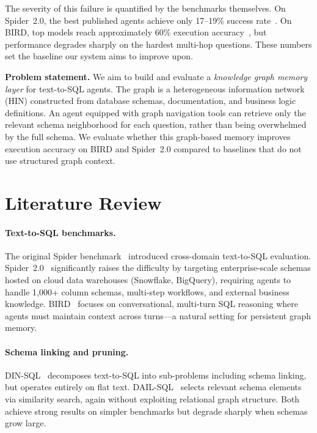 \documentclass[11pt]{article}
\begin{document}
The severity of this failure is quantified by the benchmarks themselves.
On Spider~2.0, the best published agents achieve only 17--19\% success rate~\cite{yu2024spider2}.
On BIRD, top models reach approximately 60\% execution accuracy~\cite{li2024bird}, but performance degrades sharply on the hardest multi-hop questions.
These numbers set the baseline our system aims to improve upon.

\textbf{Problem statement.}
We aim to build and evaluate a \emph{knowledge graph memory layer} for text-to-SQL agents.
The graph is a heterogeneous information network (HIN) constructed from database schemas, documentation, and business logic definitions.
An agent equipped with graph navigation tools can retrieve only the relevant schema neighborhood for each question, rather than being overwhelmed by the full schema.
We evaluate whether this graph-based memory improves execution accuracy on BIRD and Spider~2.0 compared to baselines that do not use structured graph context.

\section{Literature Review}

\paragraph{Text-to-SQL benchmarks.}
The original Spider benchmark~\cite{yu2018spider} introduced cross-domain text-to-SQL evaluation.
Spider~2.0~\cite{yu2024spider2} significantly raises the difficulty by targeting enterprise-scale schemas hosted on cloud data warehouses (Snowflake, BigQuery), requiring agents to handle 1{,}000+ column schemas, multi-step workflows, and external business knowledge.
BIRD~\cite{li2024bird} focuses on conversational, multi-turn SQL reasoning where agents must maintain context across turns---a natural setting for persistent graph memory.

\paragraph{Schema linking and pruning.}
DIN-SQL~\cite{pourreza2023dinsql} decomposes text-to-SQL into sub-problems including schema linking, but operates entirely on flat text.
DAIL-SQL~\cite{gao2023dailsql} selects relevant schema elements via similarity search, again without exploiting relational graph structure.
Both achieve strong results on simpler benchmarks but degrade sharply when schemas grow large.
\end{document}
